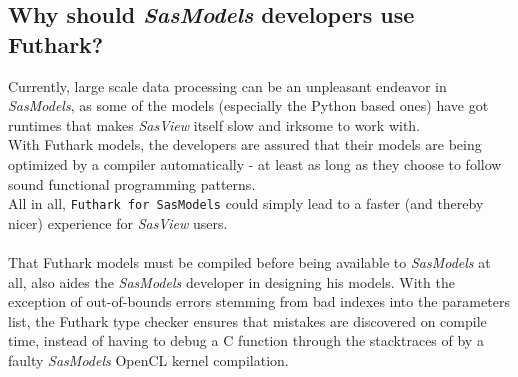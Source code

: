 \documentclass[11pt]{article}
\newcommand{\sasmodels}{\textit{SasModels}}
\newcommand{\sasview}{\textit{SasView}}
\newcommand{\futhark}{\texttt{Futhark for SasModels}}
\begin{document}
\subsection{Why should \sasmodels{} developers use Futhark?}
Currently, large scale data processing can be an unpleasant endeavor in
\sasmodels{}, as some of the models (especially the Python based ones) have
got runtimes that makes \sasview{} itself slow and irksome to work with.
\\
With Futhark models, the developers are assured that their models are being
optimized by a compiler automatically - at least as long as they choose to
follow sound functional programming patterns.\\
All in all, \futhark{} could simply lead to a faster (and thereby nicer)
experience for \sasview{} users.
\\\\
That Futhark models must be compiled before being available to \sasmodels{} at
all, also aides the \sasmodels{} developer in designing his models. With the
exception of out-of-bounds errors stemming from bad indexes into the parameters
list, the Futhark type checker ensures that mistakes are discovered on compile time,
instead of having to debug a C function through the stacktraces of by a faulty
\sasmodels{} OpenCL kernel compilation.
\\
\end{document}
